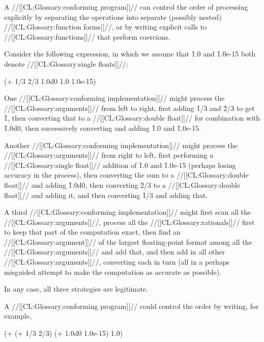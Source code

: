 A //[[CL:Glossary:conforming program]]// can control the order of processing explicitly by 
separating the operations into separate (possibly nested) //[[CL:Glossary:function forms]]//,
or by writing explicit calls to //[[CL:Glossary:functions]]// that perform coercions.


Consider the following expression, in which we assume that \f{1.0} and
\f{1.0e-15} both denote //[[CL:Glossary:single floats]]//:

\code
 (+ 1/3 2/3 1.0d0 1.0 1.0e-15)
\endcode

One //[[CL:Glossary:conforming implementation]]// might
process the //[[CL:Glossary:arguments]]// from left to right,
first adding \f{1/3} and \f{2/3} to get \f{1}, 
then converting that to a //[[CL:Glossary:double float]]// 
for combination with \f{1.0d0},
then successively converting and adding \f{1.0} and \f{1.0e-15}.

Another //[[CL:Glossary:conforming implementation]]// might process the //[[CL:Glossary:arguments]]// from
right to left, first performing a //[[CL:Glossary:single float]]// addition of \f{1.0} and
\f{1.0e-15} (perhaps losing accuracy in the process), then converting the sum to 
a //[[CL:Glossary:double float]]// and adding \f{1.0d0}, then converting \f{2/3} to a
//[[CL:Glossary:double float]]// and adding it, and then converting \f{1/3} and adding that.

A third //[[CL:Glossary:conforming implementation]]// might first scan all the //[[CL:Glossary:arguments]]//,
process all the //[[CL:Glossary:rationals]]// first to keep that part of the computation exact,
then find an //[[CL:Glossary:argument]]// of the largest floating-point format among all the
//[[CL:Glossary:arguments]]// and add that, and then add in all other //[[CL:Glossary:arguments]]//, converting
each in turn (all in a perhaps misguided attempt to make the computation as accurate
as possible).

In any case, all three strategies are legitimate.

A //[[CL:Glossary:conforming program]]// could control the order by writing, for example,

\code
 (+ (+ 1/3 2/3) (+ 1.0d0 1.0e-15) 1.0)
\endcode

\endsubsubsubsection%

\endsubsubsection%

